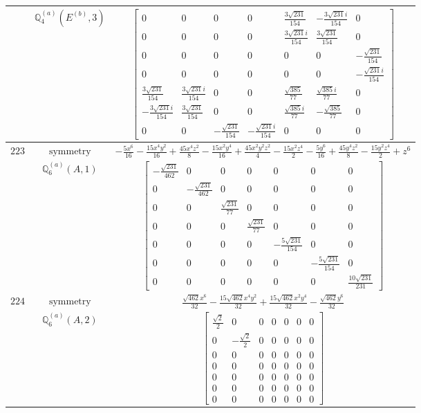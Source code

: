 \documentclass[fleqn,8pt,landscape]{jsarticle}
\begin{document}
\begin{longtable}{ccc}
$  $ & $ \mathbb{Q}_{4}^{(a)}(E^{(b)},3) $ & $ \begin{bmatrix} 0 & 0 & 0 & 0 & \frac{3 \sqrt{231}}{154} & - \frac{3 \sqrt{231} i}{154} & 0 \\ 0 & 0 & 0 & 0 & \frac{3 \sqrt{231} i}{154} & \frac{3 \sqrt{231}}{154} & 0 \\ 0 & 0 & 0 & 0 & 0 & 0 & - \frac{\sqrt{231}}{154} \\ 0 & 0 & 0 & 0 & 0 & 0 & - \frac{\sqrt{231} i}{154} \\ \frac{3 \sqrt{231}}{154} & \frac{3 \sqrt{231} i}{154} & 0 & 0 & \frac{\sqrt{385}}{77} & \frac{\sqrt{385} i}{77} & 0 \\ - \frac{3 \sqrt{231} i}{154} & \frac{3 \sqrt{231}}{154} & 0 & 0 & \frac{\sqrt{385} i}{77} & - \frac{\sqrt{385}}{77} & 0 \\ 0 & 0 & - \frac{\sqrt{231}}{154} & - \frac{\sqrt{231} i}{154} & 0 & 0 & 0 \end{bmatrix} $ \\ \hline
$ 223 $ & $ \text{symmetry} $ & $ - \frac{5 x^{6}}{16} - \frac{15 x^{4} y^{2}}{16} + \frac{45 x^{4} z^{2}}{8} - \frac{15 x^{2} y^{4}}{16} + \frac{45 x^{2} y^{2} z^{2}}{4} - \frac{15 x^{2} z^{4}}{2} - \frac{5 y^{6}}{16} + \frac{45 y^{4} z^{2}}{8} - \frac{15 y^{2} z^{4}}{2} + z^{6} $ \\
$  $ & $ \mathbb{Q}_{6}^{(a)}(A,1) $ & $ \begin{bmatrix} - \frac{\sqrt{231}}{462} & 0 & 0 & 0 & 0 & 0 & 0 \\ 0 & - \frac{\sqrt{231}}{462} & 0 & 0 & 0 & 0 & 0 \\ 0 & 0 & \frac{\sqrt{231}}{77} & 0 & 0 & 0 & 0 \\ 0 & 0 & 0 & \frac{\sqrt{231}}{77} & 0 & 0 & 0 \\ 0 & 0 & 0 & 0 & - \frac{5 \sqrt{231}}{154} & 0 & 0 \\ 0 & 0 & 0 & 0 & 0 & - \frac{5 \sqrt{231}}{154} & 0 \\ 0 & 0 & 0 & 0 & 0 & 0 & \frac{10 \sqrt{231}}{231} \end{bmatrix} $ \\ \hline
$ 224 $ & $ \text{symmetry} $ & $ \frac{\sqrt{462} x^{6}}{32} - \frac{15 \sqrt{462} x^{4} y^{2}}{32} + \frac{15 \sqrt{462} x^{2} y^{4}}{32} - \frac{\sqrt{462} y^{6}}{32} $ \\
$  $ & $ \mathbb{Q}_{6}^{(a)}(A,2) $ & $ \begin{bmatrix} \frac{\sqrt{2}}{2} & 0 & 0 & 0 & 0 & 0 & 0 \\ 0 & - \frac{\sqrt{2}}{2} & 0 & 0 & 0 & 0 & 0 \\ 0 & 0 & 0 & 0 & 0 & 0 & 0 \\ 0 & 0 & 0 & 0 & 0 & 0 & 0 \\ 0 & 0 & 0 & 0 & 0 & 0 & 0 \\ 0 & 0 & 0 & 0 & 0 & 0 & 0 \\ 0 & 0 & 0 & 0 & 0 & 0 & 0 \end{bmatrix} $ \\ \hline

\end{longtable}
\end{document}
